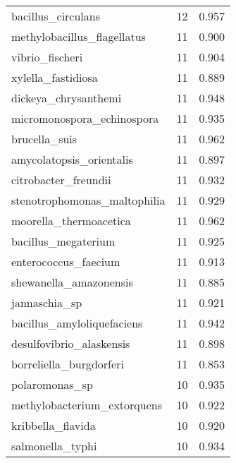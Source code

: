 \begin{tabular}{lrr}
                          bacillus\_circulans &                  12 &     0.957 \\
                 methylobacillus\_flagellatus &                  11 &     0.900 \\
                             vibrio\_fischeri &                  11 &     0.904 \\
                          xylella\_fastidiosa &                  11 &     0.889 \\
                        dickeya\_chrysanthemi &                  11 &     0.948 \\
                  micromonospora\_echinospora &                  11 &     0.935 \\
                               brucella\_suis &                  11 &     0.962 \\
                    amycolatopsis\_orientalis &                  11 &     0.897 \\
                        citrobacter\_freundii &                  11 &     0.932 \\
                stenotrophomonas\_maltophilia &                  11 &     0.929 \\
                      moorella\_thermoacetica &                  11 &     0.962 \\
                         bacillus\_megaterium &                  11 &     0.925 \\
                        enterococcus\_faecium &                  11 &     0.913 \\
                      shewanella\_amazonensis &                  11 &     0.885 \\
                               jannaschia\_sp &                  11 &     0.921 \\
                  bacillus\_amyloliquefaciens &                  11 &     0.942 \\
                    desulfovibrio\_alaskensis &                  11 &     0.898 \\
                     borreliella\_burgdorferi &                  11 &     0.853 \\
                              polaromonas\_sp &                  10 &     0.935 \\
                 methylobacterium\_extorquens &                  10 &     0.922 \\
                           kribbella\_flavida &                  10 &     0.920 \\
                            salmonella\_typhi &                  10 &     0.934 \\

\end{tabular}
